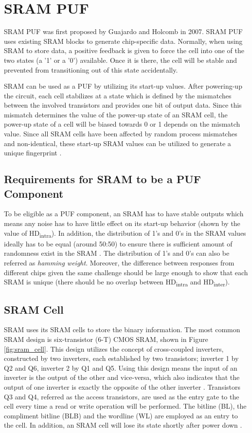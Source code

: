 \section{SRAM PUF}

SRAM PUF was first proposed by Guajardo and Holcomb in 2007. SRAM PUF uses existing SRAM blocks to generate chip-specific data.
Normally, when using SRAM to store data, a positive feedback is given to force the cell into one of the two states (a '1' or a '0') available. Once it is there, the cell will be stable and prevented from transitioning out of this state accidentally.

SRAM can be used as a PUF by utilizing its start-up values.
After powering-up the circuit, each cell stabilizes at a state which is defined by the mismatches between the involved transistors and provides one bit of output data. Since this mismatch determines the value of the power-up state of an SRAM cell, the power-up state of a cell will be biased towards 0 or 1 depends on the mismatch value. Since all SRAM cells have been affected by random process mismatches and non-identical, these start-up SRAM values can be utilized to generate a unique fingerprint \cite{dargar_2011}.

\subsection{Requirements for SRAM to be a PUF Component}\label{ch:requirement_sram_puf}
To be eligible as a PUF component, an SRAM has to have stable outputs which means any noise has to have little effect on its start-up behavior (shown by the value of HD\textsubscript{intra}). In addition, the distribution of 1's and 0's in the SRAM values ideally has to be equal (around 50:50) to ensure there is sufficient amount of randomness exist in the SRAM \cite{6865541}. The distribution of 1's and 0's can also be referred as \textit{hamming weight}. Moreover, the difference between responses from different chips given the same challenge should be large enough to show that each SRAM is unique (there should be no overlap between HD\textsubscript{intra} and HD\textsubscript{inter}).

\subsection{SRAM Cell}
SRAM uses its SRAM cells to store the binary information. The most common SRAM design is six-transistor (6-T) CMOS SRAM, shown in Figure \ref{fig:sram_cell}. This design utilizes the concept of cross-coupled inverters, constructed by two inverters, each established by two transistors; inverter 1 by Q2 and Q6, inverter 2 by Q1 and Q5. Using this design means the input of an inverter is the output of the other and vice-versa, which also indicates that the output of one inverter is exactly the opposite of the other inverter \cite{modeling_sram}.
Transistors Q3 and Q4, referred as the access transistors, are used as the entry gate to the cell every time a read or write operation will be performed. The bitline (BL), the compliment bitline (BLB) and the wordline (WL) are employed as an entry to the cell. In addition, an SRAM cell will lose its state shortly after power down \cite{maes_2016}.

